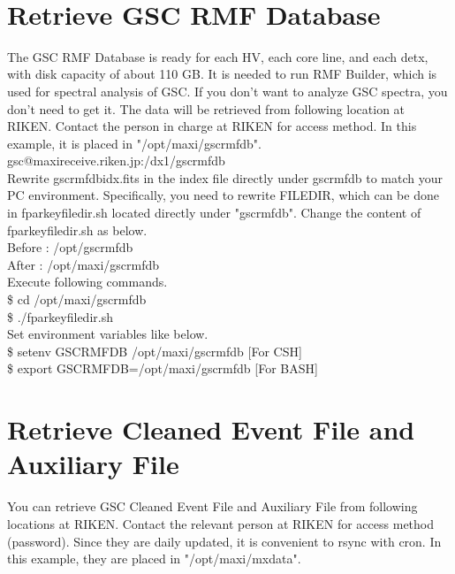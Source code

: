 \documentclass[10pt]{report}
\makeatletter
\renewcommand{\_}{\textscale{.5}{\textbf{\textunderscore}}}
\newcommand{\at}{\makeatletter @\makeatother}
\makeatother
\begin{document}
\

\section{Retrieve GSC RMF Database}\label{sec:3.4}

The GSC RMF Database is ready for each HV, each core line, and each detx, with disk capacity of about 110 GB. It is needed to run RMF Builder, which is used for spectral analysis of GSC. If you don't want to analyze GSC spectra, you don't need to get it. The data will be retrieved from following location at RIKEN. Contact the person in charge at RIKEN for access method. In this example, it is placed in "/opt/maxi/gscrmfdb". \\

\noindent gsc\at maxireceive.riken.jp:/dx1/gscrmfdb \\

Rewrite gscrmfdbidx.fits in the index file directly under gscrmfdb to match your PC environment. Specifically, you need to rewrite FILEDIR, which can be done in fparkey\_filedir.sh located directly under "gscrmfdb". Change the content of fparkey\_filedir.sh as below. \\

\noindent Before : /opt/gscrmfdb \\
After\phantom{/} : /opt/maxi/gscrmfdb \\

\noindent Execute following commands. \\

\noindent \$ cd /opt/maxi/gscrmfdb\\
\$ ./fparkey\_filedir.sh\\

\noindent Set environment variables like below. \\

\noindent \$ setenv GSCRMFDB /opt/maxi/gscrmfdb  \phantom{aa}[For CSH]\\

\noindent \$ export GSCRMFDB=/opt/maxi/gscrmfdb  \phantom{aa}[For BASH]\\

\section{Retrieve Cleaned Event File and Auxiliary File}\label{sec:3.5}

You can retrieve GSC Cleaned Event File and Auxiliary File from following locations at RIKEN. Contact the relevant person at RIKEN for access method (password). Since they are daily updated, it is convenient to rsync with cron. In this example, they are placed in "/opt/maxi/mxdata". \\
\end{document}
